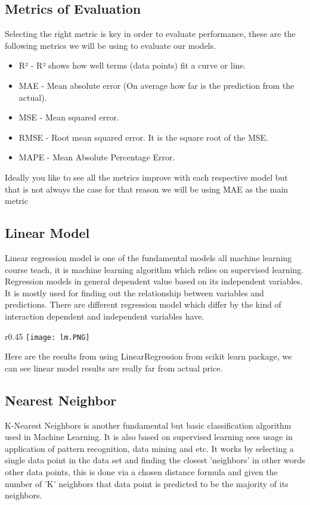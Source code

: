 \documentclass{article}
\begin{document}
\begin{titlepage}
\subsection{Metrics of Evaluation}
Selecting the right metric is key in order to evaluate performance, these are the following metrics we will be using to evaluate our models. 
\begin{itemize}
  \item R² - R² shows how well terms (data points) fit a curve or line.
  \item MAE - Mean absolute error (On average how far is the prediction from the actual).
  \item MSE - Mean squared error.
  \item RMSE - Root mean squared error. It is the square root of the MSE.
  \item MAPE - Mean Absolute Percentage Error.
\end{itemize}
Ideally you like to see all the metrics improve with each respective model but that is not always the case for that reason we will be using MAE as the main metric
\subsection{Linear Model}
Linear regression model is one of the fundamental models all machine learning course teach, it is machine learning algorithm which relies on supervised learning. Regression models in general dependent value based on its independent variables. It is mostly used for finding out the relationship between variables and predictions. There are different regression model which differ by the kind of interaction dependent and independent variables have. 
\\
\begin{wrapfigure}{r}{0.45\textwidth}
\texttt{[image: lm.PNG]} 
\label{fig:wrapfig2}
\end{wrapfigure}
Here are the results from using LinearRegression from scikit learn package, we can see linear model results are really far from actual price. 
\subsection{Nearest Neighbor}


K-Nearest Neighbors is another fundamental but basic classification algorithm used in Machine Learning. It is also based on supervised learning sees usage in application of pattern recognition, data mining and etc. It works by selecting a single data point in the data set and finding the closest 'neighbors' in other words other data points, this is done via a chosen distance formula and given the number of 'K' neighbors that data point is predicted to be the majority of its neighbors.  


\end{titlepage}
\end{document}
